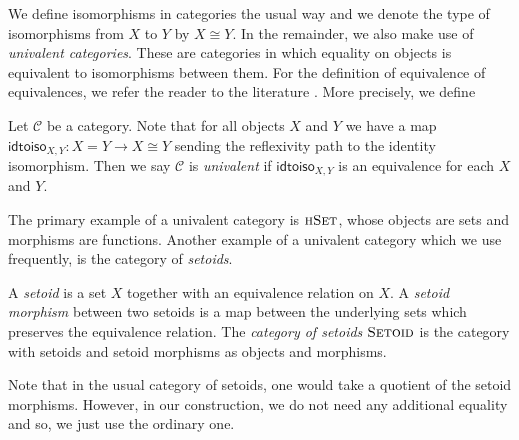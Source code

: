 \documentclass[9pt]{entcs}
\newcommand{\type}[1]{\textsc{#1}}
\newcommand{\category}[1]{\textsc{#1}}
\newcommand{\function}[1]{\mathsf{#1}}
\newcommand{\hset}{\type{hSet}} %
\newcommand{\0}{\textbf{0}} %
\newcommand{\iso}[2]{#1 \cong #2} %
\newcommand{\setoids}{\category{Setoid}} %
\newcommand{\idtoiso}{\function{idtoiso}} %
\newcommand{\remove}[1]{} %
\begin{document}
We define isomorphisms in categories the usual way and we denote the type of isomorphisms from $X$ to $Y$ by $\iso{X}{Y}$.
In the remainder, we also make use of \emph{univalent categories}.
These are categories in which equality on objects is equivalent to isomorphisms between them.
For the definition of equivalence of equivalences, we refer the reader to the literature \cite{hottbook}.
More precisely, we define

\begin{definition}
\label{def:univalent}
Let $\mathcal{C}$ be a category.
Note that for all objects $X$ and $Y$ we have a map $\idtoiso_{X,Y} : X = Y \rightarrow \iso{X}{Y}$ sending the reflexivity path to the identity isomorphism.
Then we say $\mathcal{C}$ is \emph{univalent} if $\idtoiso_{X,Y}$ is an equivalence for each $X$ and $Y$.
\end{definition}

The primary example of a univalent category is $\hset$, whose objects are sets and morphisms are functions.
Another example of a univalent category which we use frequently, is the category of \emph{setoids}.

\begin{definition}
\label{def:setoid}
A \emph{setoid} is a set $X$ together with an equivalence relation on $X$.
A \emph{setoid morphism} between two setoids  is a map between the underlying sets which preserves the equivalence relation.
The \emph{category of setoids} $\setoids$ is the category with setoids and setoid morphisms as objects and morphisms.
\end{definition}

\remove{
\begin{definition}
We define
\begin{itemize}
	\item A \emph{setoid} is a set $X$ together with an equivalence relation on $X$;
	\item A \emph{setoid morphism} between two setoids  is a map between the underlying sets which preserves the equivalence relation.
\end{itemize}
The \emph{category of setoids} $\setoids$ is the category with setoids and setoid morphisms as objects and morphisms.
\end{definition}
}

Note that in the usual category of setoids, one would take a quotient of the setoid morphisms.
However, in our construction, we do not need any additional equality and so, we just use the ordinary one.
\end{document}
